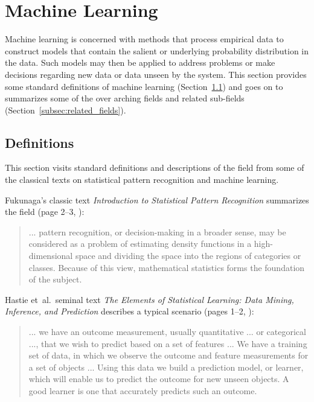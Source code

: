 
\section{Machine Learning} 
\label{intro:machinelearning}

Machine learning is concerned with methods that process empirical data to construct models that contain the salient or underlying probability distribution in the data. Such models may then be applied to address problems or make decisions regarding new data or data unseen by the system.
This section provides some standard definitions of machine learning (Section~\ref{subsec:definitions}) and goes on to summarizes some of the over arching fields and related sub-fields (Section~\ref{subsec:related_fields}).

\subsection{Definitions}
\label{subsec:definitions}
This section visits standard definitions and descriptions of the field from some of the classical texts on statistical pattern recognition and machine learning. 

Fukunaga's classic text \emph{Introduction to Statistical Pattern Recognition} summarizes the field (page 2--3, \cite{Fukunaga1990}):

\begin{quotation}
... pattern recognition, or decision-making in a broader sense, may be considered as a problem of estimating density functions in a high-dimensional space and dividing the space into the regions of categories or classes. Because of this view, mathematical statistics forms the foundation of the subject.
\end{quotation} 

Hastie et~al.\ seminal text \emph{The Elements of Statistical Learning: Data Mining, Inference, and Prediction} describes a typical scenario (pages 1--2, \cite{Hastie2009}):

\begin{quotation}
... we have an outcome measurement, usually quantitative ... or categorical ..., that we wish to predict based on a set of features ... We have a training set of data, in which we observe the outcome and feature measurements for a set of objects ... Using this data we build a prediction model, or learner, which will enable us to predict the outcome for new unseen objects. A good learner is one that accurately predicts such an outcome.
\end{quotation} 

